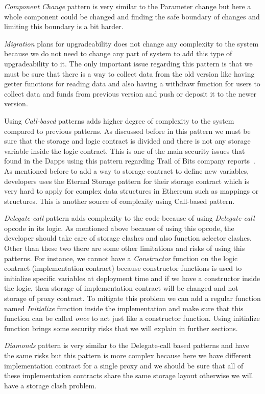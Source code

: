 \textit{Component Change} pattern is very similar to the Parameter change but here a whole component could be changed and finding the safe boundary of changes and limiting this boundary is a bit harder.

\textit{Migration} plans for upgradeability does not change any complexity to the system because we do not need to change any part of system to add this type of upgradeability to it. The only important issue regarding this pattern is that we must be sure that there is a way to collect data from the old version like having getter functions for reading data and also having a withdraw function for users to collect data and funds from previous version and push or deposit it to the newer version.

Using \textit{Call-based} patterns adds higher degree of complexity to the system compared to previous patterns. As discussed before in this pattern we must be sure that the storage and logic contract is divided and there is not any storage variable inside the logic contract. This is one of the main security issues that found in the Dapps using this pattern regarding Trail of Bits company reports~\cite{ToBantiPattern}. As mentioned before to add a way to storage contract to define new variables, developers uses the Eternal Storage pattern for their storage contract which is very hard to apply for complex data structures in Ethereum such as mappings or structures. This is another source of complexity using Call-based pattern.

\textit{Delegate-call} pattern adds complexity to the code because of using \textit{Delegate-call} opcode in its logic. As mentioned above because of using this opcode, the developer should take care of storage clashes and also function selector clashes. Other than these two there are some other limitations and risks of using this patterns. For instance, we cannot have a \textit{Constructor} function on the logic contract (implementation contract) because constructor functions is used to initialize specific variables at deployment time and if we have a constructor inside the logic, then storage of implementation contract will be changed and not storage of proxy contract. To mitigate this problem we can add a regular function named \textit{Initialize} function inside the implementation and make sure that this function can be called \emph{once} to act just like a constructor function. Using initialize function brings some security risks that we will explain in further sections.

\textit{Diamonds} pattern is very similar to the Delegate-call based patterns and have the same risks but this pattern is more complex because here we have different implementation contract for a single proxy and we should be sure that all of these implementation contracts share the same storage layout otherwise we will have a storage clash problem. 

